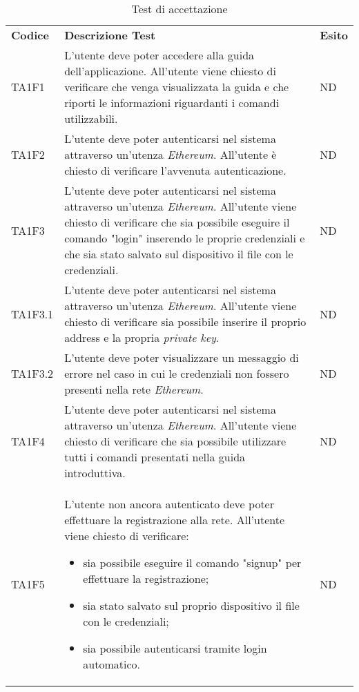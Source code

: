 \setlength{\tabcolsep}{0.5em}
\renewcommand{\arraystretch}{1.5}
\begin{longtable}{|C{1.5cm}|C{10cm}|C{1.5cm}|}

	\caption{Test di accettazione }\\
	\hline

	\textbf{Codice} & \textbf{Descrizione Test}  & \textbf{Esito}
	\tabularnewline
	\endfirsthead

	TA1F1 &
	L’utente deve poter accedere alla guida dell’applicazione. All’utente viene chiesto di veriﬁcare che venga visualizzata la guida e che riporti le informazioni riguardanti i comandi utilizzabili.  &
	ND \\

	TA1F2  &
	L’utente deve poter autenticarsi nel sistema attraverso un'utenza \textit{Ethereum\glos}.
	All’utente è chiesto di veriﬁcare l’avvenuta autenticazione. &
	ND \\

	TA1F3 &
	L’utente deve poter autenticarsi nel sistema attraverso un'utenza \textit{Ethereum\glos}. All’utente viene chiesto di verificare che sia possibile eseguire il comando "login" inserendo le proprie credenziali e che sia stato salvato sul dispositivo il file con le credenziali. &
	ND \\

	TA1F3.1 &
	L’utente deve poter autenticarsi nel sistema attraverso un'utenza \textit{Ethereum\glos}. All’utente viene chiesto di verificare sia possibile inserire il proprio address e la propria \textit{private key\glos}. &
	ND \\

	TA1F3.2 &
	L’utente deve poter visualizzare un messaggio di errore nel caso in cui le credenziali non fossero	presenti nella rete \textit{Ethereum\glo}. &
	ND \\

	TA1F4 &
	L’utente deve poter autenticarsi nel sistema attraverso un'utenza \textit{Ethereum}. All’utente viene chiesto di verificare che sia possibile utilizzare tutti i comandi presentati nella guida introduttiva. &
	ND \\

	TA1F5 &
	L’utente non ancora autenticato deve poter effettuare la registrazione alla rete. All’utente viene chiesto di verificare:
	\begin{itemize}
		\item sia possibile eseguire il comando "signup" per effettuare la registrazione;
		\item sia stato salvato sul proprio dispositivo il file con le credenziali;
		\item sia possibile autenticarsi tramite login automatico.
	\end{itemize} &
	ND \\ [-5ex]


\end{longtable}
